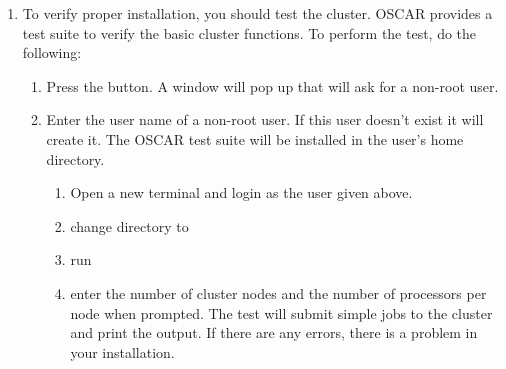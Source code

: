 \begin {enumerate}

\item To verify proper installation, you should test the cluster.
  OSCAR provides a test suite to verify the basic cluster functions.
  To perform the test, do the following:

  \begin{enumerate}
  \item Press the  button. A window will
    pop up that will ask for a non-root user.
  \item Enter the user name of a non-root user. If this user doesn't
    exist it will create it. The OSCAR test suite will be installed in
    the user's home directory.
    \begin{enumerate}
    \item Open a new terminal and login as the user given above.
    \item change directory to 
    \item run 
    \item enter the number of cluster nodes and the number of
      processors per node when prompted. The test will submit simple
      jobs to the cluster and print the output. If there are any
      errors, there is a problem in your installation.
    \end{enumerate}
  \end{enumerate}


\end{enumerate}
